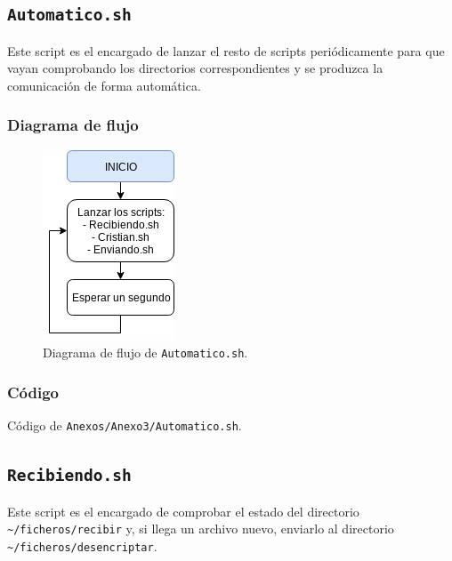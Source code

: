 \newpage
\subsection{\texttt{Automatico.sh}}
Este script es el encargado de lanzar el resto de scripts periódicamente para que vayan comprobando los directorios correspondientes y se produzca la comunicación de forma automática.

\subsubsection{Diagrama de flujo}
\begin{figure}[h]
	\centering
	\includegraphics[scale=0.9]{Anexos/Anexo3/Diagramas/Automatico.png}
	\caption{Diagrama de flujo de \texttt{Automatico.sh}.}
	\label{Diagrama de flujo de Automatico.sh}
\end{figure}

\subsubsection{Código}

\begin{center}
	Código de \texttt{Anexos/Anexo3/Automatico.sh}.
\end{center}


\newpage
\subsection{\texttt{Recibiendo.sh}}
Este script es el encargado de comprobar el estado del directorio \texttt{\textasciitilde/ficheros/recibir} y, si llega un archivo nuevo, enviarlo al directorio \texttt{\textasciitilde/ficheros/desencriptar}.


